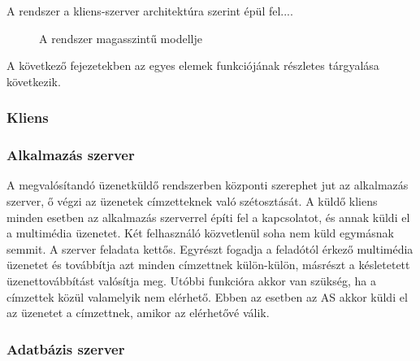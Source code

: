 A rendszer a kliens-szerver architektúra szerint épül fel....

\begin{figure}[htbp]
\center
{}
\caption{A rendszer magasszintű modellje}
\label{fig:model}
\end{figure}


A következő fejezetekben az egyes elemek funkciójának részletes tárgyalása következik.

\subsubsection{Kliens}
\label{sec:kliens_pc}




\subsubsection{Alkalmazás szerver}
A megvalósítandó üzenetküldő rendszerben központi szerephet jut az alkalmazás szerver, ő végzi az üzenetek címzetteknek való szétosztását. A küldő kliens minden esetben az alkalmazás szerverrel építi fel a kapcsolatot, és annak küldi el a multimédia üzenetet. Két felhasználó közvetlenül soha nem küld egymásnak semmit. A szerver feladata kettős. Egyrészt fogadja a feladótól érkező multimédia üzenetet és továbbítja azt minden címzettnek külön-külön, másrészt a késletetett üzenettovábbítást valósítja meg. Utóbbi funkcióra akkor van szükség, ha a címzettek közül valamelyik nem elérhető. Ebben az esetben az AS akkor küldi el az üzenetet a címzettnek, amikor az elérhetővé válik.

\subsubsection{Adatbázis szerver}
\label{sec:adatbszerver}

